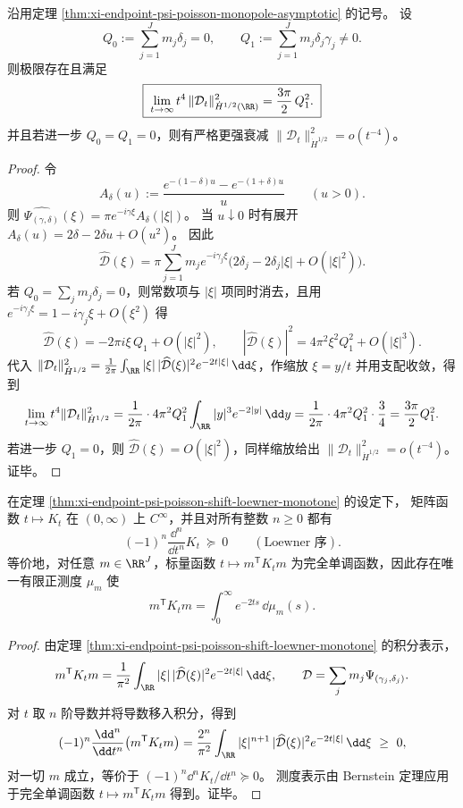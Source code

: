 \begin{theorem}\label{thm:xi-endpoint-psi-poisson-dipole-asymptotic}
沿用定理 \ref{thm:xi-endpoint-psi-poisson-monopole-asymptotic} 的记号。
设
\[
Q_0:=\sum_{j=1}^{J}m_j\delta_j=0,
\qquad
Q_1:=\sum_{j=1}^{J}m_j\delta_j\gamma_j\neq 0.
\]
则极限存在且满足
\[
\boxed{\;
\lim_{t\to\infty}t^{4}\,\|\mathcal D_t\|_{\dot H^{1/2}(\RR)}^{2}
=\frac{3\pi}{2}\,Q_1^{2}. \;}
\]
并且若进一步 \(Q_0=Q_1=0\)，则有严格更强衰减 \(\|\mathcal D_t\|_{\dot H^{1/2}}^{2}=o(t^{-4})\)。
\end{theorem}
\begin{proof}
令
\[
A_\delta(u):=\frac{e^{-(1-\delta)u}-e^{-(1+\delta)u}}{u}\qquad(u>0).
\]
则
\(
\widehat{\Psi_{(\gamma,\delta)}}(\xi)=\pi e^{-i\gamma\xi}A_\delta(|\xi|)
\)。
当 \(u\downarrow 0\) 时有展开 \(A_\delta(u)=2\delta-2\delta u+O(u^2)\)。
因此
\[
\widehat{\mathcal D}(\xi)
=\pi\sum_{j=1}^{J}m_j e^{-i\gamma_j\xi}\bigl(2\delta_j-2\delta_j|\xi|+O(|\xi|^2)\bigr).
\]
若 \(Q_0=\sum_j m_j\delta_j=0\)，则常数项与 \(|\xi|\) 项同时消去，且用 \(e^{-i\gamma_j\xi}=1-i\gamma_j\xi+O(\xi^2)\) 得
\[
\widehat{\mathcal D}(\xi)=-2\pi i\xi\,Q_1+O(|\xi|^2),
\qquad
|\widehat{\mathcal D}(\xi)|^2=4\pi^2\xi^2Q_1^2+O(|\xi|^3).
\]
代入
\(
\|\mathcal D_t\|_{\dot H^{1/2}}^{2}=\frac{1}{2\pi}\int_{\RR}|\xi|\,|\widehat{\mathcal D}(\xi)|^{2}e^{-2t|\xi|}\,\dd\xi
\)，作缩放 \(\xi=y/t\) 并用支配收敛，得到
\[
\lim_{t\to\infty}t^4\|\mathcal D_t\|_{\dot H^{1/2}}^{2}
=\frac{1}{2\pi}\cdot 4\pi^2Q_1^2\int_{\RR}|y|^3e^{-2|y|}\,\dd y
=\frac{1}{2\pi}\cdot 4\pi^2Q_1^2\cdot \frac34
=\frac{3\pi}{2}Q_1^2.
\]
若进一步 \(Q_1=0\)，则 \(\widehat{\mathcal D}(\xi)=O(|\xi|^2)\)，同样缩放给出 \(\|\mathcal D_t\|_{\dot H^{1/2}}^{2}=o(t^{-4})\)。证毕。
\end{proof}

\begin{corollary}[矩阵值完全单调性]\label{cor:xi-endpoint-psi-poisson-complete-monotonicity}
在定理 \ref{thm:xi-endpoint-psi-poisson-shift-loewner-monotone} 的设定下，
矩阵函数 \(t\mapsto K_t\) 在 \((0,\infty)\) 上 \(C^\infty\)，并且对所有整数 \(n\ge 0\) 都有
\[
\boxed{\;
(-1)^n\frac{\dd^n}{\dd t^n}K_t\ \succeq\ 0\qquad(\text{Loewner 序}).\;}
\]
等价地，对任意 \(m\in\RR^J\)，标量函数 \(t\mapsto m^{\mathsf T}K_t m\) 为完全单调函数，因此存在唯一有限正测度 \(\mu_m\) 使
\[
m^{\mathsf T}K_t m=\int_{0}^{\infty}e^{-2ts}\,\dd\mu_m(s).
\]
\end{corollary}
\begin{proof}
由定理 \ref{thm:xi-endpoint-psi-poisson-shift-loewner-monotone} 的积分表示，
\[
m^{\mathsf T}K_t m=\frac{1}{\pi^2}\int_{\RR}|\xi|\,|\widehat{\mathcal D}(\xi)|^2e^{-2t|\xi|}\,\dd\xi,
\qquad \mathcal D=\sum_j m_j\Psi_{(\gamma_j,\delta_j)}.
\]
对 \(t\) 取 \(n\) 阶导数并将导数移入积分，得到
\[
(-1)^n\frac{\dd^n}{\dd t^n}\bigl(m^{\mathsf T}K_t m\bigr)
=\frac{2^n}{\pi^2}\int_{\RR}|\xi|^{n+1}\,|\widehat{\mathcal D}(\xi)|^2e^{-2t|\xi|}\,\dd\xi\ \ge\ 0,
\]
对一切 \(m\) 成立，等价于 \((-1)^n\dd^nK_t/\dd t^n\succeq 0\)。
测度表示由 Bernstein 定理应用于完全单调函数 \(t\mapsto m^{\mathsf T}K_t m\) 得到。证毕。
\end{proof}

\endinput
